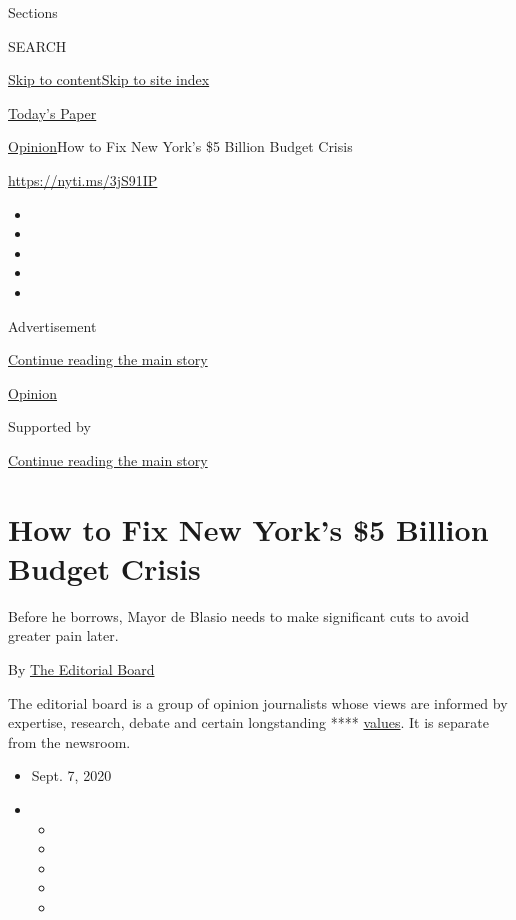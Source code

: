 Sections

SEARCH

\protect\hyperlink{site-content}{Skip to
content}\protect\hyperlink{site-index}{Skip to site index}

\href{https://myaccount.nytimes3xbfgragh.onion/auth/login?response_type=cookie\&client_id=vi}{}

\href{https://www.nytimes3xbfgragh.onion/section/todayspaper}{Today's
Paper}

\href{/section/opinion}{Opinion}\textbar{}How to Fix New York's \$5
Billion Budget Crisis

\url{https://nyti.ms/3jS91IP}

\begin{itemize}
\item
\item
\item
\item
\item
\end{itemize}

Advertisement

\protect\hyperlink{after-top}{Continue reading the main story}

\href{/section/opinion}{Opinion}

Supported by

\protect\hyperlink{after-sponsor}{Continue reading the main story}

\hypertarget{how-to-fix-new-yorks-5-billion-budget-crisis}{%
\section{How to Fix New York's \$5 Billion Budget
Crisis}\label{how-to-fix-new-yorks-5-billion-budget-crisis}}

Before he borrows, Mayor de Blasio needs to make significant cuts to
avoid greater pain later.

By
\href{https://www.nytimes3xbfgragh.onion/interactive/opinion/editorialboard.html}{The
Editorial Board}

The editorial board is a group of opinion journalists whose views are
informed by expertise, research, debate and certain longstanding ****
\href{https://www.nytimes3xbfgragh.onion/interactive/2018/opinion/editorialboard.html}{values}.
It is separate from the newsroom.

\begin{itemize}
\item
  Sept. 7, 2020
\item
  \begin{itemize}
  \item
  \item
  \item
  \item
  \item
  \end{itemize}
\end{itemize}

